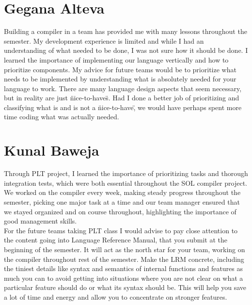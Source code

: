 \documentclass[letterpaper,12pt]{report}
\begin{document}
  \section{Gegana Alteva}
    Building a compiler in a team has provided me with many lessons throughout the semester. My development experience is limited and while I had an understanding of what needed to be done, I was not sure how it should be done. I learned the importance of implementing our language vertically and how to prioritize components. My advice for future teams would be to prioritize what needs to be implemented by understanding what is absolutely needed for your language to work. There are many language design aspects that seem necessary, but in reality are just \"nice-to-have\"s. Had I done a better job of prioritizing and classifying what is and is not a \"nice-to-have\", we would have perhaps spent more time coding what was actually needed.

  \section{Kunal Baweja}
    Through PLT project, I learned the importance of prioritizing tasks and thorough integration tests, which were both essential throughout the SOL compiler project. We worked on the compiler every week, making steady progress throughout the semester, picking one major task at a time and our team manager ensured that we stayed organized and on course throughout, highlighting the importance of good management skills.\\

    For the future teams taking PLT class I would advise to pay close attention to the content going into Language Reference Manual, that you submit at the beginning of the semester. It will act as the north star for your team, working on the compiler throughout rest of the semester. Make the LRM  concrete, including the tiniest details like syntax and semantics of internal functions and features as much you can to avoid getting into situations where you are not clear on what a particular feature should do or what its syntax should be. This will help you save a lot of time and energy and allow you to concentrate on stronger features.
\end{document}
